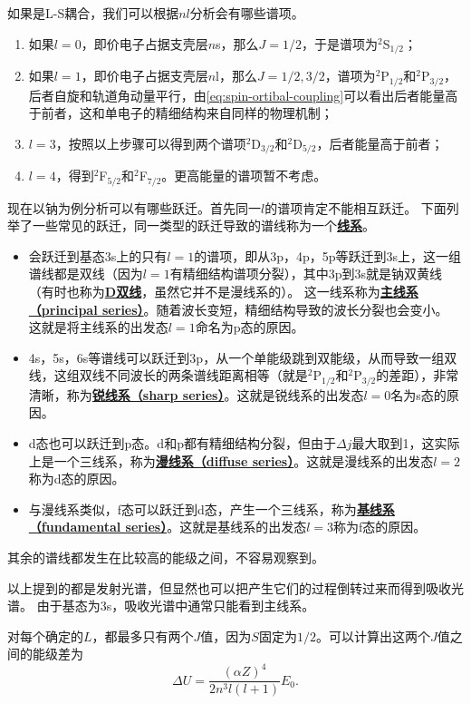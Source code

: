 \documentclass[UTF8, a4paper]{ctexart}
\newcommand*{\lsterm}[3]{$^{#1}${#2}$_{#3}$}
\newcommand*{\concept}[1]{\underline{\textbf{#1}}}
\begin{document}
如果是L-S耦合，我们可以根据$nl$分析会有哪些谱项。
\begin{enumerate}
    \item 如果$l=0$，即价电子占据支壳层$n$s，那么$J=1/2$，于是谱项为\lsterm{2}{S}{1/2}；
    \item 如果$l=1$，即价电子占据支壳层$n$l，那么$J=1/2, 3/2$，谱项为\lsterm{2}{P}{1/2}和\lsterm{2}{P}{3/2}，后者自旋和轨道角动量平行，由\eqref{eq:spin-ortibal-coupling}可以看出后者能量高于前者，这和单电子的精细结构来自同样的物理机制；
    \item $l=3$，按照以上步骤可以得到两个谱项\lsterm{2}{D}{3/2}和\lsterm{2}{D}{5/2}，后者能量高于前者；
    \item $l=4$，得到\lsterm{2}{F}{5/2}和\lsterm{2}{F}{7/2}。更高能量的谱项暂不考虑。
\end{enumerate}

现在以钠为例分析可以有哪些跃迁。首先同一$l$的谱项肯定不能相互跃迁。
下面列举了一些常见的跃迁，同一类型的跃迁导致的谱线称为一个\concept{线系}。

\begin{itemize}
    \item 会跃迁到基态3s上的只有$l=1$的谱项，即从3p，4p，5p等跃迁到3s上，这一组谱线都是双线（因为$l=1$有精细结构谱项分裂），其中3p到3s就是钠双黄线（有时也称为\concept{D双线}，虽然它并不是漫线系的）。
    这一线系称为\concept{主线系（principal series）}。随着波长变短，精细结构导致的波长分裂也会变小。
    这就是将主线系的出发态$l=1$命名为p态的原因。
    \item 4s，5s，6s等谱线可以跃迁到3p，从一个单能级跳到双能级，从而导致一组双线，这组双线不同波长的两条谱线距离相等（就是\lsterm{2}{P}{1/2}和\lsterm{2}{P}{3/2}的差距），非常清晰，称为\concept{锐线系（sharp series）}。这就是锐线系的出发态$l=0$名为s态的原因。
    \item d态也可以跃迁到p态。d和p都有精细结构分裂，但由于$\Delta j$最大取到1，这实际上是一个三线系，称为\concept{漫线系（diffuse series）}。这就是漫线系的出发态$l=2$称为d态的原因。
    \item 与漫线系类似，f态可以跃迁到d态，产生一个三线系，称为\concept{基线系（fundamental series）}。这就是基线系的出发态$l=3$称为f态的原因。
\end{itemize}

其余的谱线都发生在比较高的能级之间，不容易观察到。

以上提到的都是发射光谱，但显然也可以把产生它们的过程倒转过来而得到吸收光谱。
由于基态为3s，吸收光谱中通常只能看到主线系。

对每个确定的$L$，都最多只有两个$J$值，因为$S$固定为$1/2$。可以计算出这两个$J$值之间的能级差为
\begin{equation}
    \Delta U = \frac{(\alpha Z)^4}{2 n^3 l(l+1)} E_0.
\end{equation}
\end{document}
